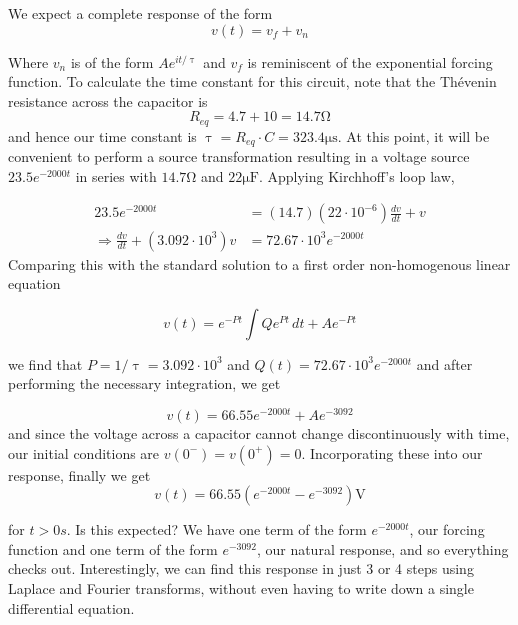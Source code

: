 \documentclass[11pt]{article}
\numberwithin{equation}{section}
\begin{document}
\begin{flushleft}
\begin{tcolorbox}[colback=green!5, colframe=green!75!black, title=\textbf{Example 2.3}, breakable]
We expect a complete response of the form
\begin{equation*}
v(t) = v_f + v_n
\end{equation*}

Where $v_n$ is of the form $Ae^{it/\uptau}$ and $v_f$ is reminiscent of the exponential forcing function. To calculate the time constant for this
circuit, note that the Th\'{e}venin resistance across the capacitor is
\begin{equation*}
 R_{eq} = 4.7 + 10 = 14.7\si{\ohm}
\end{equation*}
and hence our time constant is $\uptau = R_{eq} \cdot C = 323.4 \si{\micro\second}$. At this point, it will be convenient to perform a source transformation
resulting in a voltage source $23.5e^{-2000t}$ in series with $14.7\si{\ohm}$ and $22 \si{\micro\farad}$. Applying Kirchhoff's loop law,

\begin{align*}
23.5e^{-2000t} &= (14.7)(22\cdot 10^{-6})\frac{dv}{dt} + v\\
\Rightarrow \frac{dv}{dt} + (3.092\cdot 10^{3})v &= 72.67\cdot 10^{3}e^{-2000t}
\end{align*}
Comparing this with the standard solution to a first order non-homogenous linear equation

\begin{equation*}
v(t) = e^{-Pt}\int Qe^{Pt}\, dt + Ae^{-Pt}
\end{equation*}

we find that $P=1/\uptau=3.092\cdot 10^{3}$ and $Q(t)=72.67\cdot 10^{3}e^{-2000t}$ and after performing the necessary integration, we get

\begin{equation*}
 v(t) = 66.55e^{-2000t} + Ae^{-3092}
\end{equation*}
and since the voltage across a capacitor cannot change discontinuously with time, our initial conditions are $v(0^-)=v(0^+)=0$. Incorporating
these into our response, finally we get
\begin{equation*}
 v(t) = 66.55(e^{-2000t} - e^{-3092})\si{\volt}
\end{equation*}

for $t>0s$. Is this expected? We have one term of the form $e^{-2000t}$, our forcing function and one term of the form $e^{-3092}$, our natural
response, and so everything checks out. Interestingly, we can find this response in just 3 or 4 steps using Laplace and Fourier transforms, without
even having to write down a single differential equation.


\end{tcolorbox}
\end{flushleft}
\end{document}
